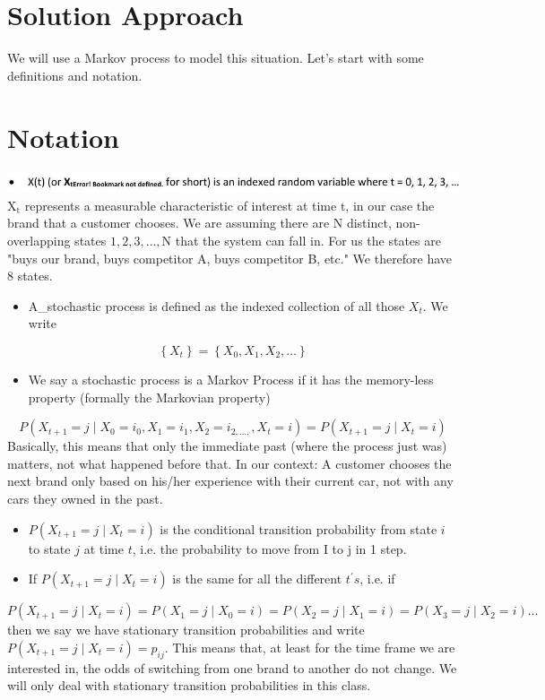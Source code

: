 \documentclass[10pt]{article}
\begin{document}
\section{Solution Approach}
We will use a Markov process to model this situation. Let's start with some definitions and notation.

\section{Notation}
\includegraphics[max width=\textwidth]{2022_07_05_5945264bba2a5f6ba667g-73}\\
$\mathrm{X}_{\mathrm{t}}$ represents a measurable characteristic of interest at time $\mathrm{t}$, in our case the brand that a customer chooses. We are assuming there are $\mathrm{N}$ distinct, non-overlapping states $1,2,3, \ldots, \mathrm{N}$ that the system can fall in. For us the states are "buys our brand, buys competitor A, buys competitor B, etc." We therefore have 8 states.

\begin{itemize}
  \item A\_stochastic process is defined as the indexed collection of all those $X_{t}$. We write
\end{itemize}
$$
\left\{X_{t}\right\}=\left\{X_{0}, X_{1}, X_{2}, \ldots\right\}
$$

\begin{itemize}
  \item We say a stochastic process is a Markov Process if it has the memory-less property (formally the Markovian property)
\end{itemize}
$$
P\left(X_{t+1}=j \mid X_{0}=i_{0}, X_{1}=i_{1}, X_{2}=i_{2, \ldots,}, X_{t}=i\right)=P\left(X_{t+1}=j \mid X_{t}=i\right)
$$
Basically, this means that only the immediate past (where the process just was) matters, not what happened before that. In our context: A customer chooses the next brand only based on his/her experience with their current car, not with any cars they owned in the past.

\begin{itemize}
  \item $P\left(X_{t+1}=j \mid X_{t}=i\right)$ is the conditional transition probability from state $i$ to state $j$ at time $t$, i.e. the probability to move from I to $\mathrm{j}$ in 1 step.

  \item If $P\left(X_{t+1}=j \mid X_{t}=i\right)$ is the same for all the different $t^{\prime} s$, i.e. if

\end{itemize}
$$
P\left(X_{t+1}=j \mid X_{t}=i\right)=P\left(X_{1}=j \mid X_{0}=i\right)=P\left(X_{2}=j \mid X_{1}=i\right)=P\left(X_{3}=j \mid X_{2}=i\right) \ldots
$$
then we say we have stationary transition probabilities and write $P\left(X_{t+1}=j \mid X_{t}=i\right)=p_{i j}$. This means that, at least for the time frame we are interested in, the odds of switching from one brand to another do not change. We will only deal with stationary transition probabilities in this class.
\end{document}
